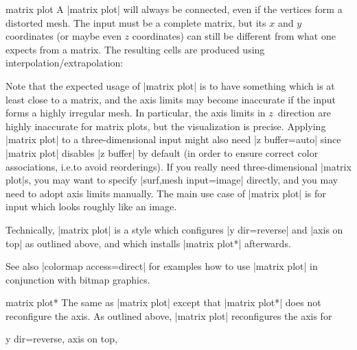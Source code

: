 {\begin{plottype}[/pgfplots]{matrix plot}
    A |matrix plot| will always be connected, even if the vertices form a
    distorted mesh. The input must be a complete matrix, but its $x$ and $y$
    coordinates (or maybe even $z$ coordinates) can still be different from
    what one expects from a matrix. The resulting cells are produced using
    interpolation/extrapolation:
\begin{codeexample}[]
\end{codeexample}
    Note that the expected usage of |matrix plot| is to have something which is
    at least close to a matrix, and the axis limits may become inaccurate if
    the input forms a highly irregular mesh. In particular, the axis limits in
    $z$~direction are highly inaccurate for matrix plots, but the visualization
    is precise. Applying |matrix plot| to a three-dimensional input might also
    need |z buffer=auto| since |matrix plot| disables |z buffer| by default (in
    order to ensure correct color associations, i.e.\@ to avoid reorderings).
    If you really need three-dimensional |matrix plot|s, you may want to
    specify |surf,mesh input=image| directly, and you may need to adopt axis
    limits manually. The main use case of |matrix plot| is for input which
    looks roughly like an image.

    Technically, |matrix plot| is a style which configures |y dir=reverse| and
    |axis on top| as outlined above, and which installs |matrix plot*|
    afterwards.

    See also |colormap access=direct| for examples how to use |matrix plot| in
    conjunction with bitmap graphics.
\end{plottype}

\begin{plottype}{matrix plot*}
    The same as |matrix plot| except that |matrix plot*| does not reconfigure
    the axis. As outlined above, |matrix plot| reconfigures the axis for
\begin{codeexample}
y dir=reverse,
axis on top,
\end{codeexample}


\end{plottype}}
